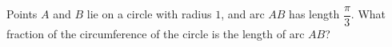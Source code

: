Points $A$ and $B$ lie on a circle with radius $1$, and arc $AB$ has length $\dfrac{\pi}{3}$. What fraction of the circumference of the circle is the length of arc $AB$?
